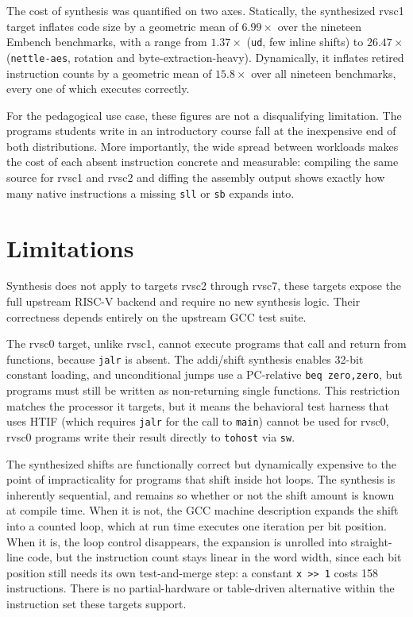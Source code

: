 The cost of synthesis was quantified on two axes. Statically, the synthesized rvsc1 target inflates
code size by a geometric mean of $6.99\times$ over the nineteen Embench benchmarks, with a range from
$1.37\times$ (\texttt{ud}, few inline shifts) to $26.47\times$ (\texttt{nettle-aes}, rotation and
byte-extraction-heavy). Dynamically, it inflates retired instruction counts by a geometric mean of
$15.8\times$ over all nineteen benchmarks, every one of which executes correctly.

For the pedagogical use case, these figures are not a disqualifying limitation. The programs students
write in an introductory course fall at the inexpensive end of both distributions. More importantly,
the wide spread between workloads makes the cost of each absent instruction concrete and measurable:
compiling the same source for rvsc1 and rvsc2 and diffing the assembly output shows exactly how many
native instructions a missing \texttt{sll} or \texttt{sb} expands into.

\section{Limitations}

Synthesis does not apply to targets rvsc2 through rvsc7, these targets expose the full upstream
RISC-V backend and require no new synthesis logic. Their correctness depends entirely on the upstream
GCC test suite.

The rvsc0 target, unlike rvsc1, cannot execute programs that call and return from functions, because
\texttt{jalr} is absent. The addi/shift synthesis enables 32-bit constant loading, and unconditional
jumps use a PC-relative \texttt{beq zero,zero}, but programs
must still be written as non-returning single functions. This restriction matches the processor it
targets, but it means the behavioral test harness that uses HTIF (which requires \texttt{jalr} for
the call to \texttt{main}) cannot be used for rvsc0, rvsc0 programs write their result directly to
\texttt{tohost} via \texttt{sw}.

The synthesized shifts are functionally correct but dynamically expensive to the point of
impracticality for programs that shift inside hot loops. The synthesis is inherently sequential, and
remains so whether or not the shift amount is known at compile time. When it is not, the GCC machine
description expands the shift into a counted loop, which at run time executes one iteration per bit
position. When it is, the loop control disappears, the expansion is unrolled into straight-line
code, but the instruction count stays linear in the word width, since each bit position still needs
its own test-and-merge step: a constant \texttt{x >> 1} costs 158 instructions. There is no
partial-hardware or table-driven alternative within the instruction set these targets support.

